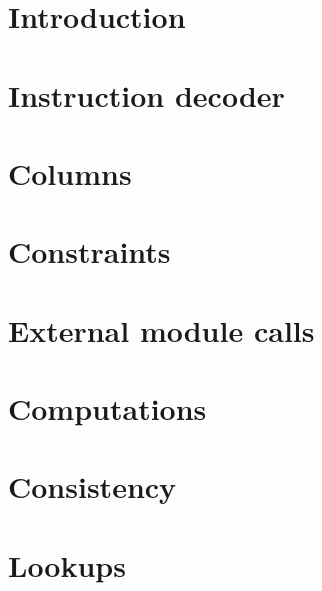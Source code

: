 

\section{Introduction}             \label{mxp: intro}                       
\section{Instruction decoder}      \label{mxp: instruction decoder}         
\section{Columns}                  \label{mxp: columns}                     
\section{Constraints}              \label{mxp: constraints}                 
\section{External module calls}    \label{mxp: calls}                       
\section{Computations}             \label{mxp: computations}                
\section{Consistency}              \label{mxp: consistency}                 
\section{Lookups}                  \label{mxp: lookups}                     
